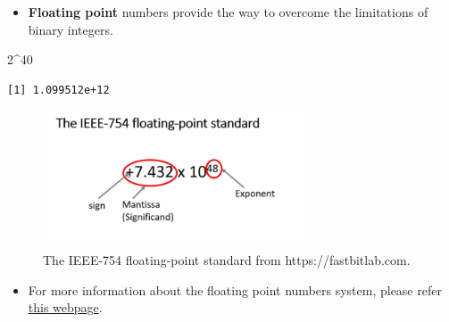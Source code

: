 \documentclass[
  9pt,
  a4paper,
  ignorenonframetext,
  notheorems]{beamer}
\newenvironment{Shaded}{\begin{snugshade}}{\end{snugshade}}
\newcommand{\DecValTok}[1]{\textcolor[rgb]{0.68,0.00,0.00}{#1}}
\newcommand{\SpecialCharTok}[1]{\textcolor[rgb]{0.37,0.37,0.37}{#1}}
\providecommand{\tightlist}{%
  \setlength{\itemsep}{0pt}\setlength{\parskip}{0pt}}\usepackage{longtable,booktabs,array}
\begin{document}
\begin{frame}[fragile]
\begin{itemize}
\tightlist
\item
  \textbf{Floating point} numbers provide the way to overcome the
  limitations of binary integers.
\end{itemize}

\begin{Shaded}
\begin{Highlighting}[]
\DecValTok{2}\SpecialCharTok{\^{}}\DecValTok{40}
\end{Highlighting}
\end{Shaded}

\begin{verbatim}
[1] 1.099512e+12
\end{verbatim}

\begin{figure}

{\centering \includegraphics[width=0.7\textwidth,height=\textheight]{images/floating.png}

}

\caption{The IEEE-754 floating-point standard from
https://fastbitlab.com.}

\end{figure}

\begin{itemize}
\tightlist
\item
  For more information about the floating point numbers system, please
  refer
  \href{https://www.geeksforgeeks.org/ieee-standard-754-floating-point-numbers/}{this
  webpage}.
\end{itemize}
\end{frame}
\end{document}
